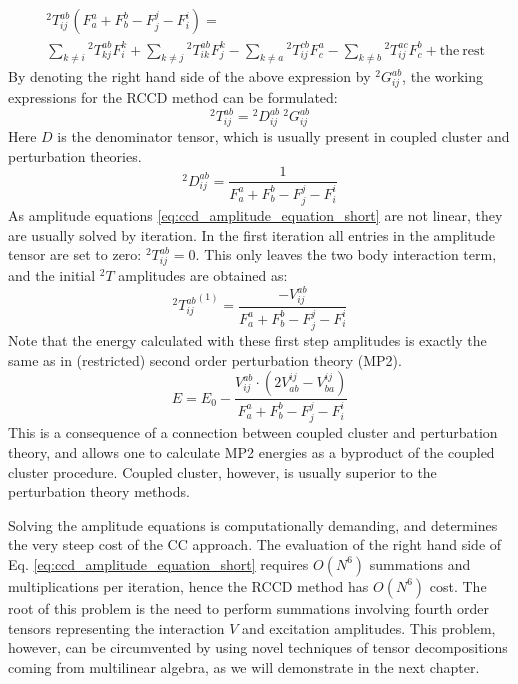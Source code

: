 %
\begin{equation}
\begin{aligned}
 & {}^2T_{ij}^{ab} (F_{a}^{a} + F_{b}^{b} - F_{j}^{j} - F_{i}^{i}) = \\
 & \sum_{k\neq i} {}^{2}T^{ab}_{kj} F^{k}_{i}
+ \sum_{k \neq j} {}^{2}T^{ab}_{ik} F^{k}_{j}
- \sum_{k \neq a} {}^{2}T^{cb}_{ij} F^{a}_{c}
- \sum_{k \neq b} {}^{2}T^{ac}_{ij} F^{b}_{c} + \mathrm{the~rest} 
\end{aligned}
\label{eq:ccd_splitting}
\end{equation}
%
By denoting the right hand side of the above expression by ${}^{2}G_{ij}^{ab}$, 
the working expressions for the RCCD method can be formulated:
%
\begin{equation}
{}^{2}T_{ij}^{ab} = {}^{2}D_{ij}^{ab} ~ {}^{2}G_{ij}^{ab}
\label{eq:ccd_amplitude_equation_short}
\end{equation}
%
Here $D$ is the denominator tensor, which is usually present in coupled cluster 
and perturbation theories.
%
\begin{equation}
 {}^{2}D_{ij}^{ab} = \frac{1}{F_{a}^{a} + F_{b}^{b} - F_{j}^{j} - 
F_{i}^{i}}
\label{eq:cc_denom_definition}
\end{equation}
As amplitude equations 
\ref{eq:ccd_amplitude_equation_short} are 
not linear, they are usually solved by iteration. In the first iteration all 
entries in the amplitude tensor are set to zero: ${}^{2}T_{ij}^{ab} = 0$. This 
only leaves the two body interaction term, and the initial ${}^2T$ amplitudes 
are 
obtained as:
%
\begin{equation}
 {}^{2}{T_{ij}^{ab}}^{(1)} =  \frac{-V^{ab}_{ij}}{F_{a}^{a} + F_{b}^{b} - 
F_{j}^{j} - F_{i}^{i}}
\end{equation}
%
Note that the energy calculated with these first step amplitudes is exactly the 
same as in (restricted) second order perturbation theory (MP2).
%
\begin{equation}
 E = E_{0} -  \frac{V^{ab}_{ij} \cdot (2 V^{ij}_{ab} - 
V^{ij}_{ba})}{F_{a}^{a} + F_{b}^{b} - 
F_{j}^{j} - F_{i}^{i}}
\end{equation}
%
This is a consequence of a connection between coupled cluster and perturbation 
theory, and allows one to calculate MP2 energies as a byproduct of the coupled 
cluster procedure. Coupled cluster, however, is usually superior to the 
perturbation theory methods. 

Solving the amplitude equations is computationally demanding, and determines 
the very steep cost of the CC approach. The evaluation of 
the right hand side of Eq. \ref{eq:ccd_amplitude_equation_short} requires 
$O(N^6)$ summations and multiplications per iteration, hence the RCCD method 
has $O(N^6)$ cost. The root of this problem is the need to perform summations 
involving fourth order tensors representing the interaction $V$ and 
excitation amplitudes. This problem, however, can be circumvented by using 
novel techniques of tensor decompositions coming from multilinear 
algebra,\cite{kolda2009tensor} as we will demonstrate in the next chapter.

